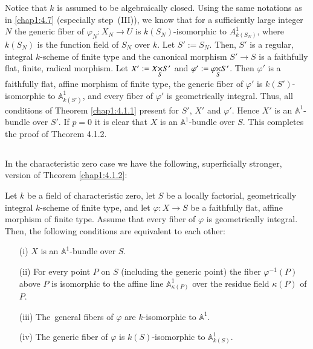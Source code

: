 \begin{proofoftheorem*}[4.1.2 ]
  Notice that $k$ is assumed to be algebraically closed. Using the same
  notations as in \ref{chap1:4.7} (especially step\pageoriginale\ (III)), we
  know that for a sufficiently large integer $N$ the generic fiber of
  $\varphi_{N}:X_{N}\to U$ is $k(S_{N})$-isomorphic to
  $A^{1}_{k(S_{N})}$, where $k(S_{N})$ is the function field of $S_{N}$
  over $k$. Let $S':=S_{N}$. Then, $S'$ is a regular, integral
  $k$-scheme of finite type and the canonical morphism $S'\to S$ is a
  faithfully flat, finite, radical morphism. Let $X':=\fprod{X}{S'}{S}$
  and $\varphi':=\fprod{\varphi}{S'}{S}$. Then $\varphi'$ is a
  faithfully flat, affine morphism of finite type, the generic fiber of
  $\varphi'$ is $k(S')$-isomorphic to $\mathbb{A}^{1}_{k(S')}$, and
  every fiber of $\varphi'$ is geometrically integral. Thus, all
  conditions of Theorem \ref{chap1:4.1.1} present for $S'$, $X'$ and
  $\varphi'$. Hence $X'$ is an $\mathbb{A}^{1}$-bundle over $S'$. If
  $p=0$ it is clear that $X$ is an $\mathbb{A}^{1}$-bundle over
  $S$. This completes the proof of Theorem 4.1.2.
\end{proofoftheorem*}

\subsection{}\label{chap1:4.9}
In the characteristic zero case we have the following, superficially
stron\-ger, version of Theorem \ref{chap1:4.1.2}:

\begin{theorem*}
Let $k$ be a field of characteristic zero, let $S$ be a locally
factorial, geometrically integral $k$-scheme of finite type, and let
$\varphi:X\to S$ be a faithfully flat, affine morphism of finite
type. Assume that every fiber of $\varphi$ is geometrically
integral. Then, the following conditions are equivalent to each other:
\begin{itemize}
\item[\rm(i)] $X$ is an $\mathbb{A}^{1}$-bundle over $S$.

\item[\rm(ii)] For every point $P$ on $S$ (including the generic
  point) the fiber $\varphi^{-1}(P)$ above $P$ is isomorphic to the
  affine line $\mathbb{A}^{1}_{\kappa(P)}$ over the residue field
  $\kappa(P)$ of $P$. 

\item[\rm(iii)] The\pageoriginale\ general fibers of $\varphi$ are
  $k$-isomorphic to $\mathbb{A}^{1}$.

\item[\rm(iv)] The generic fiber of $\varphi$ is $k(S)$-isomorphic to
  $\mathbb{A}^{1}_{k(S)}$. 
\end{itemize}
\end{theorem*}

